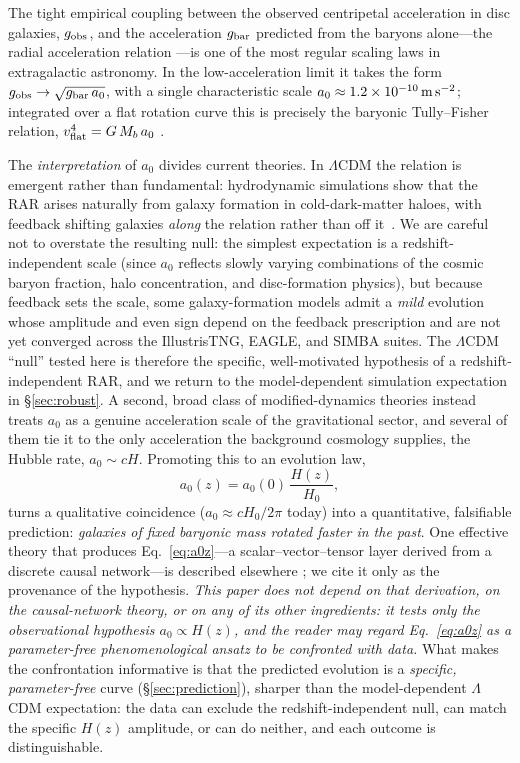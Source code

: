 \documentclass[fleqn,usenatbib]{mnras}
\newcommand{\azero}{a_0}
\begin{document}
The tight empirical coupling between the observed centripetal acceleration in disc
galaxies, $g_{\rm obs}$, and the acceleration $g_{\rm bar}$ predicted from the
baryons alone---the radial acceleration relation
\citep{McGaugh2016,Lelli2016}---is one of the most regular scaling laws in
extragalactic astronomy. In the low-acceleration limit it takes the form
$g_{\rm obs}\to\sqrt{g_{\rm bar}\,\azero}$, with a single characteristic scale
$\azero\approx1.2\times10^{-10}\,{\rm m\,s^{-2}}$; integrated over a flat rotation
curve this is precisely the baryonic Tully--Fisher relation,
$v_{\rm flat}^4=G\,M_b\,\azero$ \citep{Milgrom1983,McGaugh2016}.

The \emph{interpretation} of $\azero$ divides current theories. In $\Lambda$CDM the
relation is emergent rather than fundamental: hydrodynamic simulations show that the
RAR arises naturally from galaxy formation in cold-dark-matter haloes, with feedback
shifting galaxies \emph{along} the relation rather than off
it~\citep{Ludlow2017}. We are careful not to overstate the resulting null: the
simplest expectation is a redshift-independent scale (since $\azero$ reflects slowly
varying combinations of the cosmic baryon fraction, halo concentration, and
disc-formation physics), but because feedback sets the scale, some galaxy-formation
models admit a \emph{mild} evolution whose amplitude and even sign depend on the
feedback prescription and are not yet converged across the IllustrisTNG, EAGLE, and
SIMBA suites. The $\Lambda$CDM ``null'' tested here is therefore the specific,
well-motivated hypothesis of a redshift-independent RAR, and we return to the
model-dependent simulation expectation in \S\ref{sec:robust}. A second, broad class
of modified-dynamics theories instead treats $\azero$ as a genuine acceleration scale
of the gravitational sector, and several of them tie it to the only acceleration the
background cosmology supplies, the Hubble rate, $\azero\sim cH$. Promoting this to an
evolution law,
\begin{equation}
\azero(z)=\azero(0)\,\frac{H(z)}{H_0},
\label{eq:a0z}
\end{equation}
turns a qualitative coincidence ($\azero\approx cH_0/2\pi$ today) into a
quantitative, falsifiable prediction: \emph{galaxies of fixed baryonic mass rotated
faster in the past}. One effective theory that produces Eq.~\eqref{eq:a0z}---a
scalar--vector--tensor layer derived from a discrete causal network---is described
elsewhere \citep{TEICDoc1}; we cite it only as the provenance of the hypothesis.
\emph{This paper does not depend on that derivation, on the causal-network theory, or
on any of its other ingredients: it tests only the observational hypothesis
$\azero\propto H(z)$, and the reader may regard Eq.~\eqref{eq:a0z} as a
parameter-free phenomenological ansatz to be confronted with data.} What makes the
confrontation informative is that the predicted evolution is a \emph{specific,
parameter-free} curve (\S\ref{sec:prediction}), sharper than the model-dependent
$\Lambda$CDM expectation: the data can exclude the redshift-independent null, can
match the specific $H(z)$ amplitude, or can do neither, and each outcome is
distinguishable.
\end{document}
